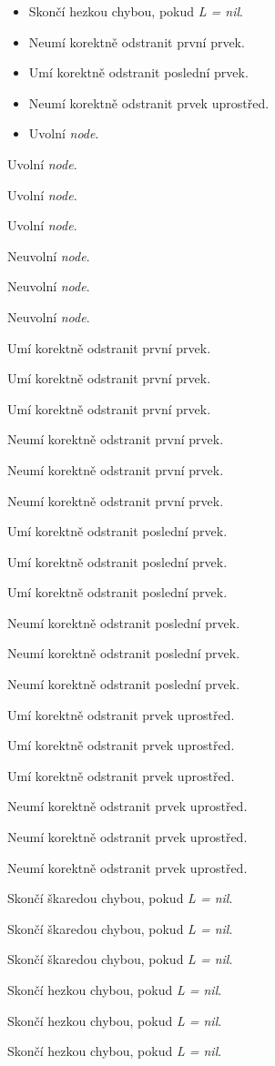 \documentclass[14pt,a4paper]{extarticle}
\begin{document}
\begin{itemize}
	\setlength{\itemsep}{0em}
	\item Skončí hezkou chybou, pokud \textit{L = nil}.
	\item Neumí korektně odstranit první prvek.
	\item Umí korektně odstranit poslední prvek.
	\item Neumí korektně odstranit prvek uprostřed.
	\item Uvolní \textit{node}.
\end{itemize}

\vspace{1em}

\newpage

\Large

\setlength{\parskip}{1em}
\centering

\begin{multicols}{2}

Uvolní \textit{node}.

Uvolní \textit{node}.

Uvolní \textit{node}.

Neuvolní \textit{node}.

Neuvolní \textit{node}.

Neuvolní \textit{node}.

\end{multicols}

Umí korektně odstranit první prvek.

Umí korektně odstranit první prvek.

Umí korektně odstranit první prvek.

Neumí korektně odstranit první prvek.

Neumí korektně odstranit první prvek.

Neumí korektně odstranit první prvek.


Umí korektně odstranit poslední prvek.

Umí korektně odstranit poslední prvek.

Umí korektně odstranit poslední prvek.

Neumí korektně odstranit poslední prvek.

Neumí korektně odstranit poslední prvek.

Neumí korektně odstranit poslední prvek.


Umí korektně odstranit prvek uprostřed.

Umí korektně odstranit prvek uprostřed.

Umí korektně odstranit prvek uprostřed.

Neumí korektně odstranit prvek uprostřed.

Neumí korektně odstranit prvek uprostřed.

Neumí korektně odstranit prvek uprostřed.


Skončí škaredou chybou, pokud \textit{L = nil}.

Skončí škaredou chybou, pokud \textit{L = nil}.

Skončí škaredou chybou, pokud \textit{L = nil}.

Skončí hezkou chybou, pokud \textit{L = nil}.

Skončí hezkou chybou, pokud \textit{L = nil}.

Skončí hezkou chybou, pokud \textit{L = nil}.
\end{document}
